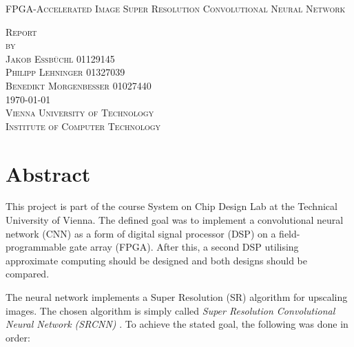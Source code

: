 \documentclass[
			fontsize = 12pt,
			paper = a4
			]
			{scrartcl}%
\newcommand{\?}{\ensuremath{^\texttt{\textbf [CITATION~NEEDED]}}}
\newcommand\blankpage{%
    \null
    \thispagestyle{empty}%
    \addtocounter{page}{-1}%
    \newpage}
\begin{document}
\begin{titlepage}
\begin{center}

\vspace*{1.5cm}
\huge
\textsc{{FPGA-Accelerated Image Super Resolution Convolutional Neural Network}}\\
\vspace*{1cm}

\vspace{2cm}
\Large
\textsc{Report}\\
{\normalsize \textsc{by}}\\
\textsc{Jakob Essbüchl} {\normalsize \textsc{01129145}}\\
\textsc{Philipp Lehninger} {\normalsize \textsc{01327039}}\\
\textsc{Benedikt Morgenbesser} {\normalsize \textsc{01027440}}\\





\vspace{6.5cm}
\textsc{\today}\\ 


\vspace{1cm}
\textsc{Vienna University of Technology}\\
{\normalsize \textsc{Institute of Computer Technology}}\\

\end{center}
\end{titlepage}
\clearpage



\section*{Abstract}
\setcounter{page}{1}

This project is part of the course System on Chip Design Lab at the Technical University of Vienna. The defined goal was to implement a convolutional neural network (CNN) as a form of digital signal processor (DSP) on a field-programmable gate array (FPGA). After this, a second DSP utilising approximate computing should be designed and both designs should be compared.


The neural network implements a Super Resolution (SR) algorithm for upscaling images. The chosen algorithm is simply called \emph{Super Resolution Convolutional Neural Network (SRCNN)} \cite{dong2015image}. To achieve the stated goal, the following was done in order:
\end{document}
